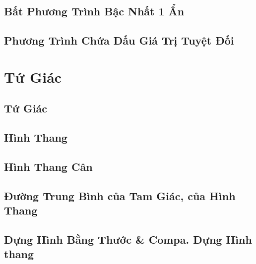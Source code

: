 \documentclass{article}
\numberwithin{equation}{section}
\begin{document}

\subsection{Bất Phương Trình Bậc Nhất 1 Ẩn}


\subsection{Phương Trình Chứa Dấu Giá Trị Tuyệt Đối}


\section{Tứ Giác}

\subsection{Tứ Giác}


\subsection{Hình Thang}


\subsection{Hình Thang Cân}


\subsection{Đường Trung Bình của Tam Giác, của Hình Thang}


\subsection{Dựng Hình Bằng Thước \& Compa. Dựng Hình thang}
\end{document}
